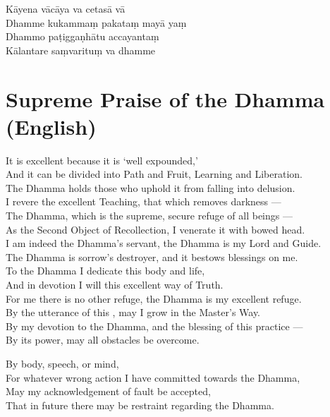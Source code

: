 
Kāyena vācāya va cetasā vā\\
Dhamme kukammaṃ pakataṃ mayā yaṃ\\
Dhammo paṭiggaṇhātu accayantaṃ\\
Kālantare saṃvarituṃ va dhamme

\section*{Supreme Praise of the Dhamma (English)}

\begin{leader}
\end{leader}

It is excellent because it is `well expounded,'\\
And it can be divided into Path and Fruit, Learning and Liberation.\\
The Dhamma holds those who uphold it from falling into delusion.\\
I revere the excellent Teaching, that which removes darkness ---\\
The Dhamma, which is the supreme, secure refuge of all beings ---\\
As the Second Object of Recollection, I venerate it with bowed head.\\
I am indeed the Dhamma's servant, the Dhamma is my Lord and Guide.\\
The Dhamma is sorrow's destroyer, and it bestows blessings on me.\\
To the Dhamma I dedicate this body and life,\\
And in devotion I will  this excellent way of Truth.\\
For me there is no other refuge, the Dhamma is my excellent refuge.\\
By the utterance of this , may I grow in the Master's Way.\\
By my devotion to the Dhamma, and the blessing of this practice ---\\
By its power, may all obstacles be overcome.


By body, speech, or mind,\\
For whatever wrong action I have committed towards the Dhamma,\\
May my acknowledgement of fault be accepted,\\
That in future there may be restraint regarding the Dhamma.

